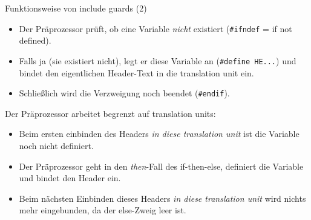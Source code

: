 \begin{frame}[fragile]{Funktionsweise von include guards (2)}
	\begin{itemize}
		\item Der Präprozessor prüft, ob eine Variable \emph{nicht} existiert (\verb|#ifndef| = if not defined).
		\item Falls ja (sie existiert nicht), legt er diese Variable an (\verb|#define HE...|) und bindet den eigentlichen Header-Text in die translation unit ein.
		\item Schließlich wird die Verzweigung noch beendet (\verb|#endif|).
	\end{itemize}
	
	\pause
	
	Der Präprozessor arbeitet begrenzt auf translation units:
	\begin{itemize}
		\item Beim ersten einbinden des Headers \emph{in diese translation unit} ist die Variable noch nicht definiert.
		\item Der Präprozessor geht in den \emph{then}-Fall des if-then-else, definiert die Variable und bindet den Header ein.
		\item Beim nächsten Einbinden dieses Headers \emph{in diese translation unit} wird nichts mehr eingebunden, da der else-Zweig leer ist.
	\end{itemize}
\end{frame}
